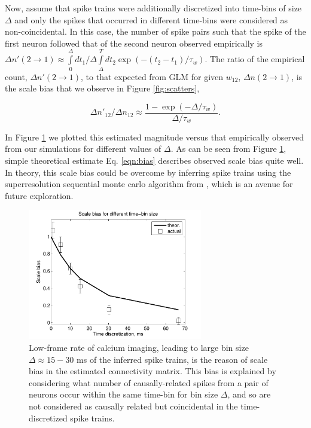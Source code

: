 Now, assume that spike trains were additionally discretized into time-bins of size $\Delta$ and only the spikes that occurred in different time-bins were considered as non-coincidental. In this case, the number of spike pairs such that the spike of the first neuron followed that of the second neuron observed empirically is $\Delta n'(2\rightarrow 1) \approx \int\limits_0^\Delta {dt_1}/{\Delta} \int\limits_{\Delta}^T dt_2 \exp(-(t_2-t_1)/\tau_w)$. The ratio of the empirical count, $\Delta n'(2\rightarrow 1)$, to that expected from GLM for given $w_{12}$, $\Delta n(2\rightarrow 1)$, is the scale bias that we observe in Figure \ref{fig:scatters},

\begin{equation}\label{eqn:bias}
\Delta n'_{12}/\Delta n_{12}\approx \frac{1-\exp(-\Delta/\tau_w)}{\Delta/\tau_w}.
\end{equation}

In Figure \ref{fig:bias} we plotted this estimated magnitude versus that empirically observed from our simulations for different values of $\Delta$. As can be seen from Figure \ref{fig:bias}, simple theoretical estimate Eq. \ref{eqn:bias} describes observed scale bias quite well.  In theory, this scale bias could be overcome by inferring spike trains using the superresolution sequential monte carlo algorithm from \cite{VogPan09}, which is an avenue for future exploration.

\begin{figure}[h]
\centering
\includegraphics[width=3in]{../figs/FigureA4_scale_bias}
\caption{Low-frame rate of calcium imaging, leading to large bin size $\Delta\approx 15-30$ ms of the inferred spike trains, is the reason of scale bias in the estimated connectivity matrix. This bias is explained by considering what number of causally-related spikes from a pair of neurons occur within the same time-bin for bin size $\Delta$, and so are not considered as causally related but coincidental in the time-discretized spike trains.}
\label{fig:bias}
\end{figure}


